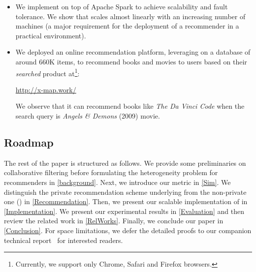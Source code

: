 \begin{itemize}
\item We implement \crossrec on top of Apache Spark to achieve scalability and fault tolerance. We show that \crossrec scales almost linearly with an increasing number of machines (a major requirement for the deployment of a recommender in a practical environment). %

\item We deployed an online recommendation platform, leveraging \graphsim on a database of around 660K items, to recommend books and movies to users based on their \emph{searched} product at\footnote{Currently, we support only Chrome, Safari and Firefox browsers.}: \begin{center}\vspace{-2mm} \url{http://x-map.work/} \vspace{-3mm}\end{center}
We observe that it can recommend books like \emph{The Da Vinci Code} when the search query is \emph{Angels \& Demons} (2009) movie. 
\end{itemize}

\subsection{Roadmap}

The rest of the paper is structured as follows. We provide some preliminaries on collaborative filtering before formulating the heterogeneity problem for recommenders in \autoref{background}. Next, we introduce our \graphsim metric in \autoref{Sim}. We distinguish the private recommendation scheme underlying \crossrec from the non-private one (\npcrossrec) in \autoref{Recommendation}. Then, we present our scalable implementation of \crossrec in \autoref{Implementation}. We present our experimental results in \autoref{Evaluation} and then review the related work in \autoref{RelWorks}. Finally, we conclude our paper in \autoref{Conclusion}. {\color{red}For space limitations, we defer the detailed proofs to our companion technical report~\cite{} for interested readers.}
